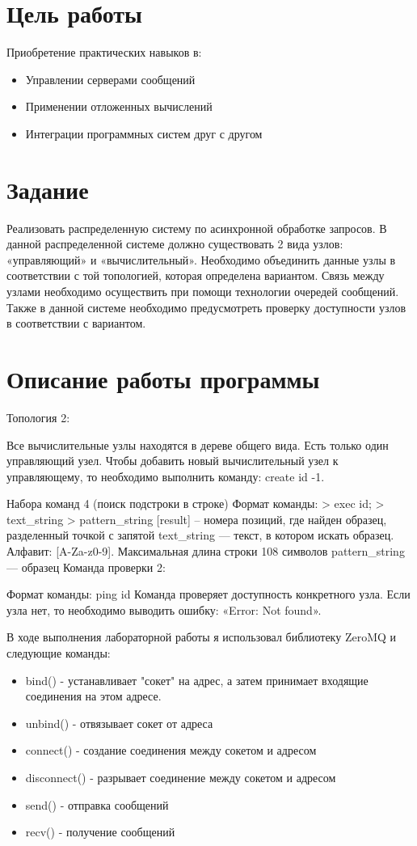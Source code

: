 \documentclass[a4paper, 12pt]{article}
\begin{document}
\section{Цель работы}
Приобретение практических навыков в:
\begin{itemize}
  \item Управлении серверами сообщений
  \item Применении отложенных вычислений
  \item Интеграции программных систем друг с другом
\end{itemize}

\section{Задание}
Реализовать распределенную систему по асинхронной обработке запросов. В данной распределенной системе должно существовать 2 вида узлов: «управляющий» и «вычислительный». Необходимо объединить данные узлы в соответствии с той топологией, которая определена вариантом. Связь между узлами необходимо осуществить при помощи технологии очередей сообщений. Также в данной системе необходимо предусмотреть проверку доступности узлов в соответствии с вариантом.

\section{Описание работы программы}
Топология 2:

Все вычислительные узлы находятся в дереве общего вида. Есть только один управляющий узел. Чтобы добавить новый вычислительный узел к управляющему, то необходимо выполнить команду: create id -1.

Набора команд 4 (поиск подстроки в строке)
Формат команды:
> exec id;
> text\_string
> pattern\_string
[result] – номера позиций, где найден образец, разделенный точкой с запятой
text\_string — текст, в котором искать образец. Алфавит: [A-Za-z0-9]. Максимальная длина строки
108 символов
pattern\_string — образец
Команда проверки 2:

Формат команды: ping id Команда проверяет доступность конкретного узла. Если узла нет, то необходимо выводить ошибку: «Error: Not found».

В ходе выполнения лабораторной работы я использовал библиотеку ZeroMQ и следующие команды:
\begin{itemize}
  \item bind() - устанавливает "сокет" на адрес, а затем принимает входящие соединения на этом адресе.
  \item unbind() - отвязывает сокет от адреса
  \item connect() - создание соединения между сокетом и адресом
  \item disconnect() - разрывает соединение между сокетом и адресом
  \item send() - отправка сообщений
  \item recv() - получение сообщений
\end{itemize}
\end{document}
